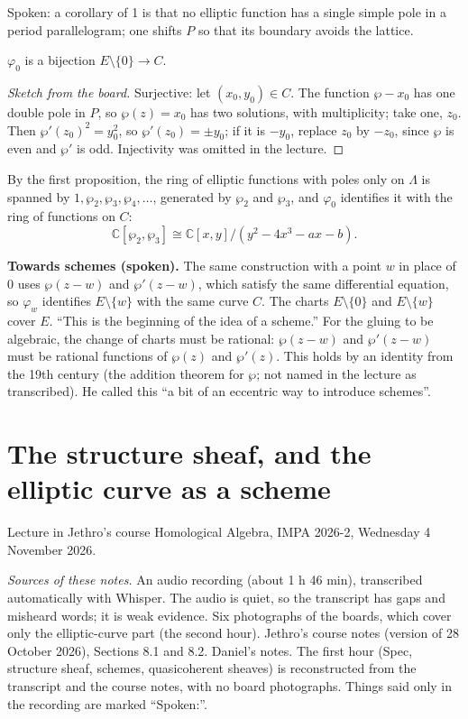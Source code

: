 \noindent
Spoken: a corollary of 1 is that no
elliptic function has a single simple pole
in a period parallelogram; one shifts $P$ so
that its boundary avoids the lattice.

\begin{proposition}
\label{proposition-phi-zero-bijection}
$\varphi_0$ is a bijection
$E \setminus \{0\} \to C$.
\end{proposition}

\begin{proof}[Sketch from the board]
Surjective: let $(x_0,y_0) \in C$. The
function $\wp - x_0$ has one double pole in
$P$, so $\wp(z) = x_0$ has two solutions,
with multiplicity; take one, $z_0$. Then
$\wp'(z_0)^2 = y_0^2$, so $\wp'(z_0) = \pm
y_0$; if it is $-y_0$, replace $z_0$ by
$-z_0$, since $\wp$ is even and $\wp'$ is
odd. Injectivity was omitted in the lecture.
\end{proof}

\noindent
By the first proposition, the ring of
elliptic functions with poles only on
$\Lambda$ is spanned by $1, \wp_2, \wp_3,
\wp_4, \ldots$, generated by $\wp_2$ and
$\wp_3$, and $\varphi_0$ identifies it with
the ring of functions on $C$:
$$
\mathbb{C}[\wp_2,\wp_3] \cong
\mathbb{C}[x,y]/(y^2 - 4x^3 - ax - b).
$$

\medskip\noindent
{\bf Towards schemes (spoken).} The same
construction with a point $w$ in place of
$0$ uses $\wp(z-w)$ and $\wp'(z-w)$, which
satisfy the same differential equation, so
$\varphi_w$ identifies $E \setminus \{w\}$
with the same curve $C$. The charts
$E\setminus\{0\}$ and $E\setminus\{w\}$
cover $E$. ``This is the beginning of the
idea of a scheme.'' For the gluing to be
algebraic, the change of charts must be
rational: $\wp(z-w)$ and $\wp'(z-w)$ must be
rational functions of $\wp(z)$ and
$\wp'(z)$. This holds by an identity from
the 19th century (the addition theorem for
$\wp$; not named in the lecture as
transcribed). He called this ``a bit of an
eccentric way to introduce schemes''.

\section{The structure sheaf, and the
elliptic curve as a scheme}
\label{section-jethro-2026-11-04}

Lecture in Jethro's course Homological
Algebra, IMPA 2026-2, Wednesday 4 November
2026.

\textit{Sources of these notes.} An audio
recording (about 1 h 46 min), transcribed
automatically with Whisper. The audio is
quiet, so the transcript has gaps and
misheard words; it is weak evidence. Six
photographs of the boards, which cover only
the elliptic-curve part (the second hour).
Jethro's course notes
\cite{vanEkerenHomologicalAlgebra2026}
(version of 28 October
2026), Sections 8.1 and 8.2. Daniel's notes.
The first hour (Spec, structure sheaf,
schemes, quasicoherent sheaves) is
reconstructed from the transcript and the
course notes, with no board photographs.
Things said only in the recording are marked
``Spoken:''.

